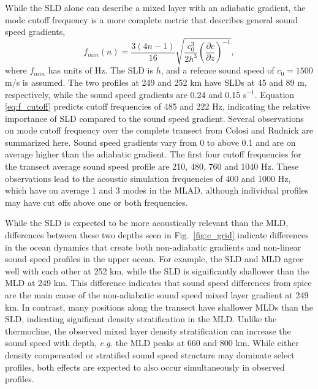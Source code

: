 \documentclass[preprint,NumberedRefs]{JASA}
\begin{document}
While the SLD alone can describe a mixed layer with an adiabatic gradient, the mode cutoff frequency\citep{Urick1982Prop} is a more complete metric that describes general sound speed gradients,
\begin{equation}
    f_{min}(n) = \frac{3(4n-1)}{16} \sqrt{\frac{c_0^3}{2h^3} \left( \frac{\partial c}{\partial z} \right) ^ {-1}},
    \label{eq:f_cutoff}
\end{equation}
where $f_{min}$ has units of Hz. The SLD is $h$, and a refence sound speed of $c_0 = 1500$ m/s is assumed. The two profiles at 249 and 252 km have SLDs at 45 and 89 m, respectively, while the sound speed gradients are 0.24 and 0.15 s$^{-1}$. Equation \eqref{eq:f_cutoff} predicts cutoff frequencies of 485 and 222 Hz, indicating the relative importance of SLD compared to the sound speed gradient. Several observations on mode cutoff frequency over the complete transect from Colosi and Rudnick\cite{colosi2020observations} are summarized here. Sound speed gradients vary from 0 to above 0.1 and are on average higher than the adiabatic gradient. The first four cutoff frequencies for the transect average sound speed profile are 210, 480, 760 and 1040 Hz. These observations lead to the acoustic simulation frequencies of 400 and 1000 Hz, which have on average 1 and 3 modes in the MLAD, although individual profiles may have cut offs above one or both frequencies.

While the SLD is expected to be more acoustically relevant than the MLD, differences between these two depths seen in Fig.~\ref{fig:c_grid} indicate differences in the ocean dynamics that create both non-adiabatic gradients and non-linear sound speed profiles in the upper ocean. For example, the SLD and MLD agree well with each other at 252 km, while the SLD is significantly shallower than the MLD at 249 km. This difference indicates that sound speed differences from spice are the main cause of the non-adiabatic sound speed mixed layer gradient at 249 km. In contrast, many positions along the transect have shallower MLDs than the SLD, indicating significant density stratification in the MLD. Unlike the thermocline, the observed mixed layer density stratification can increase the sound speed with depth, \emph{e.g.} the MLD peaks at 660 and 800 km. While either density compensated or stratified sound speed structure may dominate select profiles, both effects are expected to also occur simultaneously in observed profiles.
\end{document}

